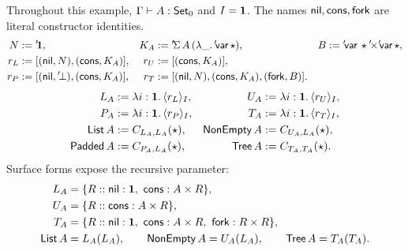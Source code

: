 \newpage
{}
Throughout this example, $\Gamma\vdash A:\mathsf{Set}_0$ and $I=\mathbf{1}$.
The names $\mathsf{nil},\mathsf{cons},\mathsf{fork}$ are literal constructor identities.
\[
\begin{aligned}
 N&:={}^{\prime}\!\mathbf{1},&
 K_A&:={}^{\prime}\!\Sigma\,A\,(\lambda\_.\,{}^{\prime}\!\mathsf{var}\,\star),&
 B&:={}^{\prime}\!\mathsf{var}\,\star\mathbin{{}^{\prime}\!\times}{}^{\prime}\!\mathsf{var}\,\star,\\
 r_L&:=[(\mathsf{nil},N),(\mathsf{cons},K_A)],&
 r_U&:=[(\mathsf{cons},K_A)],\\
 r_P&:=[(\mathsf{nil},{}^{\prime}\!\bot),(\mathsf{cons},K_A)],&
 r_T&:=[(\mathsf{nil},N),(\mathsf{cons},K_A),(\mathsf{fork},B)].
\end{aligned}
\]
\[
\begin{aligned}
 L_A&:=\lambda i:\mathbf{1}.\,\langle r_L\rangle_I,&
 U_A&:=\lambda i:\mathbf{1}.\,\langle r_U\rangle_I,\\
 P_A&:=\lambda i:\mathbf{1}.\,\langle r_P\rangle_I,&
 T_A&:=\lambda i:\mathbf{1}.\,\langle r_T\rangle_I,\\
 \mathsf{List}\,A&:=C_{L_A,L_A}(\star),&
 \mathsf{NonEmpty}\,A&:=C_{U_A,L_A}(\star),\\
 \mathsf{Padded}\,A&:=C_{P_A,L_A}(\star),&
 \mathsf{Tree}\,A&:=C_{T_A,T_A}(\star).
\end{aligned}
\]
Surface forms expose the recursive parameter:
\[
\begin{aligned}
 L_A&=\{R::\mathsf{nil}:\mathbf{1},\ \mathsf{cons}:A\times R\},\\
 U_A&=\{R::\mathsf{cons}:A\times R\},\\
 T_A&=\{R::\mathsf{nil}:\mathbf{1},\ \mathsf{cons}:A\times R,\ \mathsf{fork}:R\times R\},\\
 \mathsf{List}\,A&=L_A(L_A),\qquad
 \mathsf{NonEmpty}\,A=U_A(L_A),\qquad
 \mathsf{Tree}\,A=T_A(T_A).
\end{aligned}
\]

